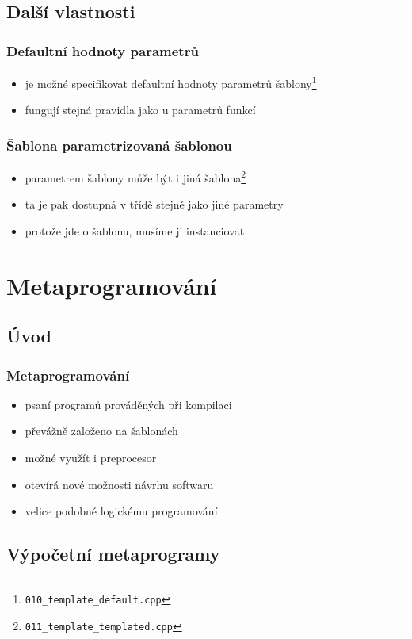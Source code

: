 	\subsection{Další vlastnosti}

	\begin{frame}
		\frametitle{Defaultní hodnoty parametrů}
		\begin{itemize}
			\item{je možné specifikovat defaultní hodnoty parametrů šablony\footnote{\texttt{010\_template\_default.cpp}}}
			\item{fungují stejná pravidla jako u parametrů funkcí}
		\end{itemize}
	\end{frame}

	\begin{frame}
		\frametitle{Šablona parametrizovaná šablonou}
		\begin{itemize}
			\item{parametrem šablony může být i jiná šablona\footnote{\texttt{011\_template\_templated.cpp}}}
			\item{ta je pak dostupná v třídě stejně jako jiné parametry}
			\item{protože jde o šablonu, musíme ji instanciovat}
		\end{itemize}
	\end{frame}

	\section{Metaprogramování}
	\subsection{Úvod}

	\begin{frame}
		\frametitle{Metaprogramování}
		\begin{itemize}
			\item{psaní programů prováděných při kompilaci}
			\item{převážně založeno na šablonách}
			\item{možné využít i preprocesor}
			\item{otevírá nové možnosti návrhu softwaru}
			\item{velice podobné logickému programování}
		\end{itemize}
	\end{frame}

	\subsection{Výpočetní metaprogramy}

